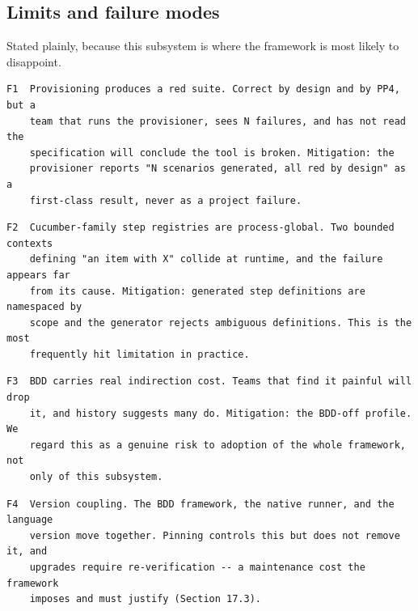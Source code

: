 \documentclass[11pt,a4paper]{article}
\begin{document}
\subsection{Limits and failure modes}

Stated plainly, because this subsystem is where the framework is most likely to disappoint.

\begin{Verbatim}[fontsize=\footnotesize,breaklines=true,breakanywhere=true,breakautoindent=false,samepage=false]
F1  Provisioning produces a red suite. Correct by design and by PP4, but a
    team that runs the provisioner, sees N failures, and has not read the
    specification will conclude the tool is broken. Mitigation: the
    provisioner reports "N scenarios generated, all red by design" as a
    first-class result, never as a project failure.
\end{Verbatim}

\begin{Verbatim}[fontsize=\footnotesize,breaklines=true,breakanywhere=true,breakautoindent=false,samepage=false]
F2  Cucumber-family step registries are process-global. Two bounded contexts
    defining "an item with X" collide at runtime, and the failure appears far
    from its cause. Mitigation: generated step definitions are namespaced by
    scope and the generator rejects ambiguous definitions. This is the most
    frequently hit limitation in practice.
\end{Verbatim}

\begin{Verbatim}[fontsize=\footnotesize,breaklines=true,breakanywhere=true,breakautoindent=false,samepage=false]
F3  BDD carries real indirection cost. Teams that find it painful will drop
    it, and history suggests many do. Mitigation: the BDD-off profile. We
    regard this as a genuine risk to adoption of the whole framework, not
    only of this subsystem.
\end{Verbatim}

\begin{Verbatim}[fontsize=\footnotesize,breaklines=true,breakanywhere=true,breakautoindent=false,samepage=false]
F4  Version coupling. The BDD framework, the native runner, and the language
    version move together. Pinning controls this but does not remove it, and
    upgrades require re-verification -- a maintenance cost the framework
    imposes and must justify (Section 17.3).
\end{Verbatim}
\end{document}
